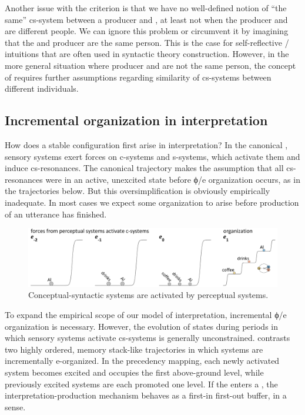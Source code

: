   Another issue with the  criterion is that we have no well-defined notion of “the same” cs-system between a producer and , at least not when the producer and  are different people. We can ignore this problem or circumvent it by imagining that the  and producer are the same person. This is the case for self-reflective / intuitions that are often used in syntactic theory construction. However, in the more general situation where producer and  are not the same person, the concept of  requires further assumptions regarding similarity of cs-systems between different individuals.  

\subsection{Incremental organization in interpretation}

How does a stable configuration first arise in interpretation? In the canonical , sensory systems exert forces on c-systems and s-systems, which activate them and induce cs-resonances. The canonical trajectory makes the assumption that all cs-resonances were in an active, unexcited state before ϕ/e organization occurs, as in the trajectories below. But this oversimplification is obviously empirically inadequate. In most cases we expect some organization to arise before production of an utterance has finished.

  
\begin{figure}
\includegraphics[width=\textwidth]{figures/Tilsen-img127.png}
\caption{Conceptual-syntactic systems are activated by perceptual systems.}
\label{fig:6:8}
\end{figure}

 

  To expand the empirical scope of our model of interpretation, incremental ϕ/e organization is necessary. However, the evolution of states during periods in which sensory systems activate cs-systems is generally unconstrained. {} contrasts two highly ordered, memory stack-like trajectories in which systems are incrementally e-organized. In the precedency mapping, each newly activated system becomes excited and occupies the first above-ground level, while previously excited systems are each promoted one level. If the  enters a , the interpretation-production mechanism behaves as a first-in first-out buffer, in a sense. 

